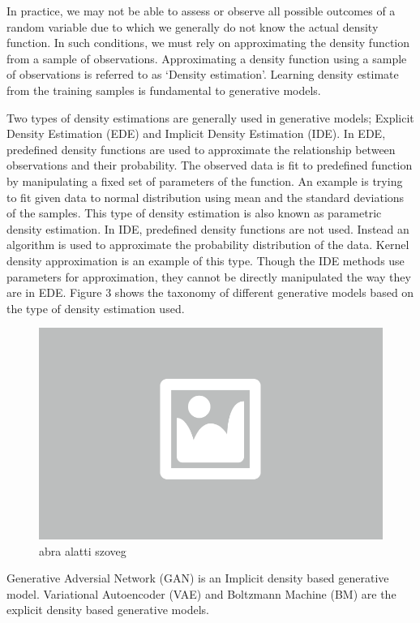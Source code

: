 In practice, we may not be able to assess or observe all possible outcomes of a random variable due to which we generally do not know the actual density function. In such conditions, we must rely on approximating the density function from a sample of observations. Approximating a density function using a sample of observations is referred to as ‘Density estimation’.  Learning density estimate from the training samples is fundamental to generative models.

Two types of density estimations are generally used in generative models; Explicit Density Estimation (EDE) and Implicit Density Estimation (IDE). In EDE, predefined density functions are used to approximate the relationship between observations and their probability. The observed data is fit to predefined function by manipulating a fixed set of parameters of the function. An example is trying to fit given data to normal distribution using mean and the standard deviations of the samples. This type of density estimation is also known as parametric density estimation. In IDE, predefined density functions are not used. Instead an algorithm is used to approximate the probability distribution of the data. Kernel density approximation is an example of this type. Though the IDE methods use parameters for approximation, they cannot be directly manipulated the way they are in EDE. Figure 3 shows the taxonomy of different generative models based on the type of density estimation used.

\begin{figure}[ht]
	\centering
	\includegraphics[width=0.65\columnwidth]{figures/abra.png}
	\caption{abra alatti szoveg}
\end{figure}

Generative Adversial Network (GAN) is an Implicit density based generative model. Variational Autoencoder (VAE) and Boltzmann Machine (BM) are the explicit density based generative models.  



